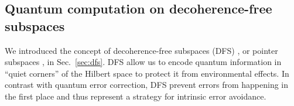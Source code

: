 \documentclass[aps,pra,reprint,amsmath,amssymb,showpacs,nofootinbib,floatfix,onecolumn,12pt]{revtex4-1}
\begin{document}
\subsection{Quantum computation on decoherence-free subspaces}

We introduced the concept of decoherence-free subspaces (DFS) \cite{Palma:1996:yy,Lidar:1998:uu,Zanardi:1997:yy,Zanardi:1997:tv,Zanardi:1998:oo,Lidar:1999:fa,Bacon:2000:yy,Duan:1998:yb,Zanardi:2001:oo,Knill:2000:aa}, or
pointer subspaces \cite{Zurek:1982:tv}, in Sec.~\ref{sec:dfs}. DFS allow us to encode quantum information in ``quiet corners'' of the Hilbert space to protect it from environmental effects. In contrast with quantum error correction, DFS prevent errors from happening in the first place and thus represent a strategy for intrinsic error avoidance.
\end{document}
